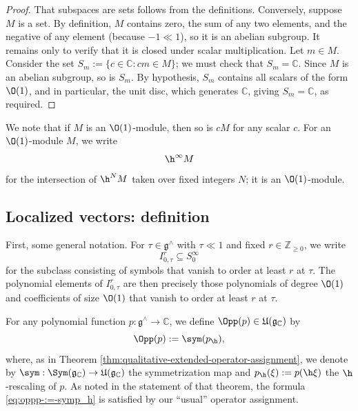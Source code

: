 \begin{proof}
  That subspaces are sets follows from the definitions.  Conversely, suppose $M$ is a set.  By definition, $M$ contains zero, the sum of any two elements, and the negative of any element (because $-1 \ll 1$), so it is an abelian subgroup.  It remains only to verify that it is closed under scalar multiplication.  Let $m \in M$.  Consider the set $S_m := \{c \in \mathbb{C} : c m \in M\}$; we must check that $S_m = \mathbb{C}$.  Since $M$ is an abelian subgroup, so is $S_m$.  By hypothesis, $S_m$ contains all scalars of the form $\O(1)$, and in particular, the unit disc, which generates $\mathbb{C}$, giving $S_m = \mathbb{C}$, as required.
\end{proof}

We note that if $M$ is an $\O(1)$-module, then so is $c M$ for any scalar $c$.  For an $\O(1)$-module $M$, we write
\begin{equation*}
  \h^\infty M
\end{equation*}
for the intersection of $\h^N M$ taken over fixed integers $N$; it is an $\O(1)$-module.

\subsection{Localized vectors: definition}\label{sec:local-vect-defin}
First, some general notation.  For $\tau \in \mathfrak{g}^\wedge$ with $\tau \ll 1$ and fixed $r \in \mathbb{Z}_{\geq 0}$, we write
\[I_{0,\tau}^r \subseteq S_0^\infty\] for the subclass consisting of symbols that vanish to order at least $r$ at $\tau$.  The polynomial elements of $I_{0,\tau}^r$ are then precisely those polynomials of degree $\O(1)$ and coefficients of size $\O(1)$ that vanish to order at least $r$ at $\tau$.

For any polynomial function $p : \mathfrak{g}^\wedge \rightarrow \mathbb{C}$, we define $\Opp(p) \in \mathfrak{U}(\mathfrak{g}_\mathbb{C})$ by
\begin{equation}\label{eq:oppp-:=-symp_h}
  \Opp(p) := \sym(p_{\h}),
\end{equation}
where, as in Theorem \ref{thm:qualitative-extended-operator-assignment}, we denote by $\sym : \Sym(\mathfrak{g}_\mathbb{C}) \rightarrow \mathfrak{U}(\mathfrak{g}_\mathbb{C})$ the symmetrization map and $p_{\h}(\xi) := p(\h \xi)$ the $\h$-rescaling of $p$.  As noted in the statement of that theorem, the formula \eqref{eq:oppp-:=-symp_h} is satisfied by our ``usual'' operator assignment.

